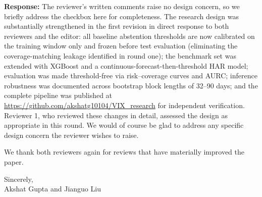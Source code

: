 \documentclass[11pt]{article}
\newcommand{\response}{\textbf{Response:} }
\begin{document}
\response The reviewer's written comments raise no design concern, so we briefly address the
checkbox here for completeness. The research design was substantially strengthened in the
first revision in direct response to both reviewers and the editor: all baseline abstention
thresholds are now calibrated on the training window only and frozen before test evaluation
(eliminating the coverage-matching leakage identified in round one); the benchmark set was
extended with XGBoost and a continuous-forecast-then-threshold HAR model; evaluation was made
threshold-free via risk--coverage curves and AURC; inference robustness was documented across
bootstrap block lengths of 32--90 days; and the complete pipeline was published at
\url{https://github.com/akshatg10104/VIX_research} for independent verification. Reviewer 1,
who reviewed these changes in detail, assessed the design as appropriate in this round. We
would of course be glad to address any specific design concern the reviewer wishes to raise.

\vspace{1em}
We thank both reviewers again for reviews that have materially improved the paper.

\begin{flushleft}
Sincerely,\\[4pt]
Akshat Gupta and Jianguo Liu
\end{flushleft}
\end{document}
